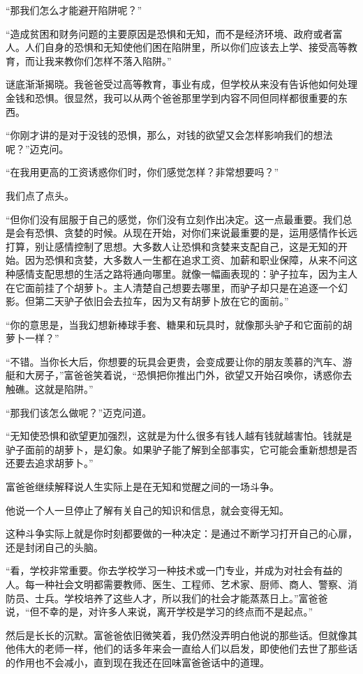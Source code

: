 “那我们怎么才能避开陷阱呢？”

“造成贫困和财务问题的主要原因是恐惧和无知，而不是经济环境、政府或者富人。人们自身的恐惧和无知使他们困在陷阱里，所以你们应该去上学、接受高等教育，而让我来教你们怎样不落入陷阱。”

谜底渐渐揭晓。我爸爸受过高等教育，事业有成，但学校从来没有告诉他如何处理金钱和恐惧。很显然，我可以从两个爸爸那里学到内容不同但同样都很重要的东西。

“你刚才讲的是对于没钱的恐惧，那么，对钱的欲望又会怎样影响我们的想法呢？”迈克问。

“在我用更高的工资诱惑你们时，你们感觉怎样？非常想要吗？”

我们点了点头。

“但你们没有屈服于自己的感觉，你们没有立刻作出决定。这一点最重要。我们总是会有恐惧、贪婪的时候。从现在开始，对你们来说最重要的是，运用感情作长远打算，别让感情控制了思想。大多数人让恐惧和贪婪来支配自己，这是无知的开始。因为恐惧和贪婪，大多数人一生都在追求工资、加薪和职业保障，从来不问这种感情支配思想的生活之路将通向哪里。就像一幅画表现的：驴子拉车，因为主人在它面前挂了个胡萝卜。主人清楚自己想要去哪里，而驴子却只是在追逐一个幻影。但第二天驴子依旧会去拉车，因为又有胡萝卜放在它的面前。”

“你的意思是，当我幻想新棒球手套、糖果和玩具时，就像那头驴子和它面前的胡萝卜一样？”

“不错。当你长大后，你想要的玩具会更贵，会变成要让你的朋友羡慕的汽车、游艇和大房子，”富爸爸笑着说，“恐惧把你推出门外，欲望又开始召唤你，诱惑你去触礁。这就是陷阱。”

“那我们该怎么做呢？”迈克问道。

“无知使恐惧和欲望更加强烈，这就是为什么很多有钱人越有钱就越害怕。钱就是驴子面前的胡萝卜，是幻象。如果驴子能了解到全部事实，它可能会重新想想是否还要去追求胡萝卜。”

富爸爸继续解释说人生实际上是在无知和觉醒之间的一场斗争。

他说一个人一旦停止了解有关自己的知识和信息，就会变得无知。

这种斗争实际上就是你时刻都要做的一种决定：是通过不断学习打开自己的心扉，还是封闭自己的头脑。

“看，学校非常重要。你去学校学习一种技术或一门专业，并成为对社会有益的人。每一种社会文明都需要教师、医生、工程师、艺术家、厨师、商人、警察、消防员、士兵。学校培养了这些人才，所以我们的社会才能蒸蒸日上。”富爸爸说，“但不幸的是，对许多人来说，离开学校是学习的终点而不是起点。”

然后是长长的沉默。富爸爸依旧微笑着，我仍然没弄明白他说的那些话。但就像其他伟大的老师一样，他们的话多年来会一直给人们以启发，即使他们去世了那些话的作用也不会减小，直到现在我还在回味富爸爸话中的道理。

